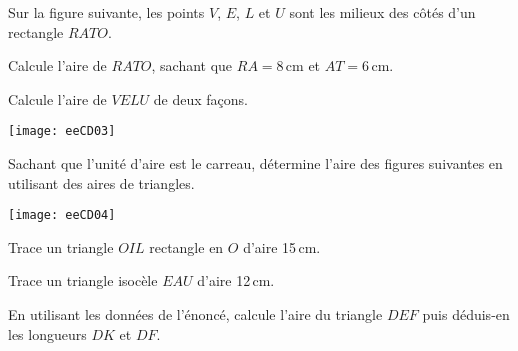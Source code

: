 \begin{exercice}
Sur la figure suivante, les points $V$, $E$, $L$ et $U$ sont les milieux des côtés d'un rectangle $RATO$.

\begin{colenumerate}{1} 
\item Calcule l'aire de $RATO$, sachant que $RA =$8\,cm et $AT =$6\,cm.
\item Calcule l'aire de $VELU$ de deux façons.
\end{colenumerate} 

\begin{center}
    \texttt{[image: eeCD03]}
\end{center}
 
\end{exercice}









\begin{exercice}
Sachant que l'unité d'aire est le carreau, détermine l'aire des figures suivantes en utilisant des aires de triangles.

\begin{center}
    \texttt{[image: eeCD04]}
\end{center}

\end{exercice}

\begin{exercice}

\begin{colenumerate}{1} 
\item Trace un triangle $OIL$ rectangle en $O$ d'aire 15\,cm.
\item Trace un triangle isocèle $EAU$ d'aire 12\,cm.
\end{colenumerate} 
\end{exercice}



\begin{exercice}[]
En utilisant les données de l'énoncé, calcule l'aire du triangle $DEF$ puis déduis-en les longueurs $DK$ et $DF$.

\end{exercice}




